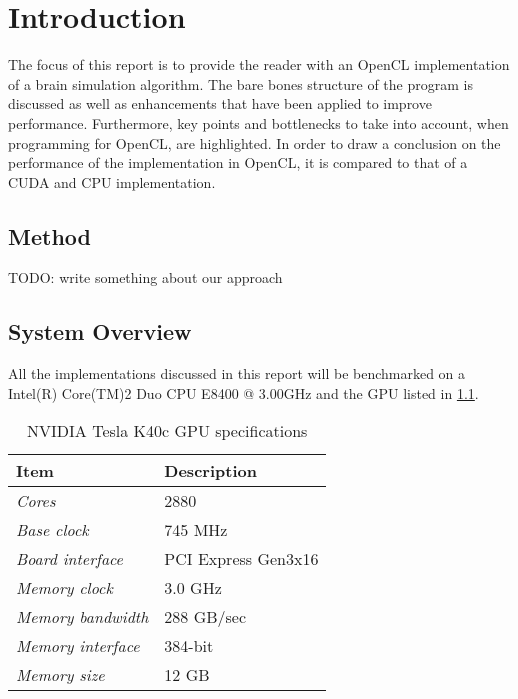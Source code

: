 \documentclass[final]{report}
\begin{document}
\chapter{Introduction}

The focus of this report is to provide the reader with an OpenCL implementation of a brain simulation algorithm.
The bare bones structure of the program is discussed as well as enhancements that have been applied to improve performance.
Furthermore, key points and bottlenecks to take into account, when programming for OpenCL, are highlighted. 
In order to draw a conclusion on the performance of the implementation in OpenCL, it is compared to that of a CUDA and CPU implementation.

\section{Method}

TODO: write something about our approach




\section{System Overview}
All the implementations discussed in this report will be benchmarked on a Intel(R) Core(TM)2 Duo CPU E8400 @ 3.00GHz and the GPU listed in \cref{tab:gpu-specs}.

\begin{table}[H]
	\centering
	\caption{NVIDIA Tesla K40c GPU specifications}
	\label{tab:gpu-specs}
	\begin{tabular}{ll}
		\toprule
			\textbf{Item} &\textbf{Description}\\
		\midrule
			\textit{Cores} & 2880	\\
			\textit{Base clock} & 745 MHz \\
			\textit{Board interface} & PCI Express Gen3x16 \\
			\textit{Memory clock} & 3.0 GHz \\
			\textit{Memory bandwidth} & 288 GB/sec \\
			\textit{Memory interface} & 384-bit \\
			\textit{Memory size} & 12 GB \\
		\bottomrule
	\end{tabular}
\end{table}
\end{document}
